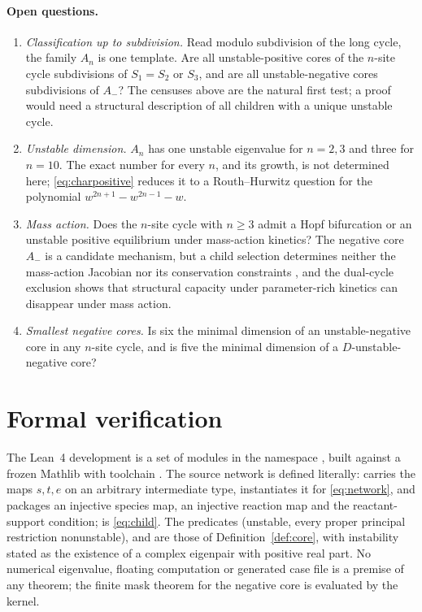 \documentclass[11pt,a4paper]{article}
\theoremstyle{plain}
\theoremstyle{definition}
\theoremstyle{remark}
\newcommand{\Aminus}{A_{-}}
\begin{document}
\paragraph{Open questions.}
\begin{enumerate}[label=(\roman*)]
\item \emph{Classification up to subdivision.} Read modulo subdivision of the long cycle, the family $A_n$ is one template. Are all unstable-positive cores of the $n$-site cycle subdivisions of $S_1=S_2$ or $S_3$, and are all unstable-negative cores subdivisions of $\Aminus$? The censuses above are the natural first test; a proof would need a structural description of all children with a unique unstable cycle.
\item \emph{Unstable dimension.} $A_n$ has one unstable eigenvalue for $n=2,3$ and three for $n=10$. The exact number for every $n$, and its growth, is not determined here; \eqref{eq:charpositive} reduces it to a Routh--Hurwitz question for the polynomial $w^{2n+1}-w^{2n-1}-w$.
\item \emph{Mass action.} Does the $n$-site cycle with $n\ge3$ admit a Hopf bifurcation or an unstable positive equilibrium under mass-action kinetics? The negative core $\Aminus$ is a candidate mechanism, but a child selection determines neither the mass-action Jacobian nor its conservation constraints \citep{KineticOrder2026}, and the dual-cycle exclusion \citep{Vassena2026} shows that structural capacity under parameter-rich kinetics can disappear under mass action.
\item \emph{Smallest negative cores.} Is six the minimal dimension of an unstable-negative core in any $n$-site cycle, and is five the minimal dimension of a $D$-unstable-negative core?
\end{enumerate}

\appendix

\section{Formal verification}\label{app:formal}

The Lean~4 development is a set of modules in the namespace , built against a frozen Mathlib with toolchain . The source network is defined literally:  carries the maps $s,t,e$ on an arbitrary intermediate type,  instantiates it for \eqref{eq:network}, and  packages an injective species map, an injective reaction map and the reactant-support condition;  is \eqref{eq:child}. The predicates  (unstable, every proper principal restriction nonunstable),  and  are those of Definition~\ref{def:core}, with instability stated as the existence of a complex eigenpair with positive real part. No numerical eigenvalue, floating computation or generated case file is a premise of any theorem; the finite mask theorem for the negative core is evaluated by the kernel.
\end{document}
